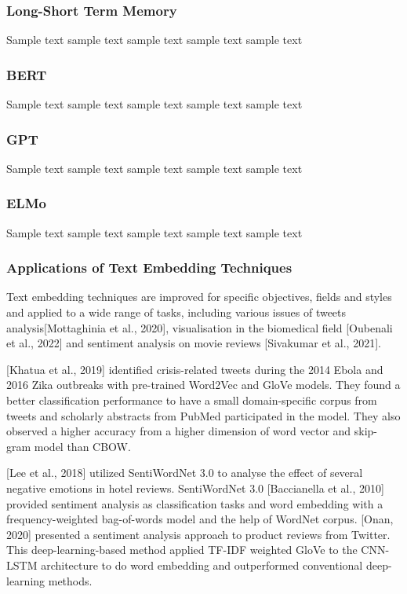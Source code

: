 \subsubsection{Long-Short Term Memory}
Sample text sample text sample text sample text sample text

\subsubsection{BERT}
Sample text sample text sample text sample text sample text

\subsubsection{GPT}
Sample text sample text sample text sample text sample text

\subsubsection{ELMo}
Sample text sample text sample text sample text sample text

\subsubsection{Applications of Text Embedding Techniques}
Text embedding techniques are improved for specific objectives, fields and styles and applied to a wide range of tasks, including various issues of tweets analysis[Mottaghinia et al., 2020], visualisation in the biomedical field [Oubenali et al., 2022] and sentiment analysis on movie reviews [Sivakumar et al., 2021].

[Khatua et al., 2019] identified crisis-related tweets during the 2014 Ebola and 2016 Zika outbreaks with pre-trained Word2Vec and GloVe models.
They found a better classification performance to have a small domain-specific corpus from tweets and scholarly abstracts from PubMed participated in the model.
They also observed a higher accuracy from a higher dimension of word vector and skip-gram model than CBOW.

[Lee et al., 2018] utilized SentiWordNet 3.0 to analyse the effect of several negative emotions in hotel reviews.
SentiWordNet 3.0 [Baccianella et al., 2010] provided sentiment analysis as classification tasks and word embedding with a frequency-weighted bag-of-words model and the help of WordNet corpus.
[Onan, 2020] presented a sentiment analysis approach to product reviews from Twitter.
This deep-learning-based method applied TF-IDF weighted GloVe to the CNN-LSTM architecture to do word embedding and outperformed conventional deep-learning methods.


